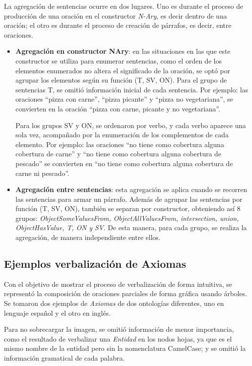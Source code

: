 La agregación de sentencias ocurre en dos lugares. Uno es durante el proceso de producción de una oración en el constructor \emph{N-Ary}, es decir dentro de una oración; el otro es durante el proceso de creación de párrafos, es decir, entre oraciones.
    
\begin{itemize}
    \item {\bf Agregación en constructor NAry}: en las situaciones en las que este constructor se utiliza para enumerar sentencias, como el orden de los elementos enumerados no altera el significado de la oración, se optó por agrupar los elementos según su función (T, SV, ON). Para el grupo de sentencias T, se omitió información inicial de cada sentencia. Por ejemplo: las oraciones ``pizza con carne'', ``pizza picante'' y ``pizza no vegetariana'', se convierten en la oración ``pizza con carne, picante y no vegetariana''.
    
    Para los grupos SV y ON, se ordenaron por verbo, y cada verbo aparece una sola vez, acompañado por la enumeración de los complementos de cada elemento. Por ejemplo: las oraciones ``no tiene como cobertura alguna cobertura de carne'' y ``no tiene como cobertura alguna cobertura de pescado'' se convierten en ``no tiene como cobertura alguna cobertura de carne ni pescado''.
    
    \item {\bf Agregación entre sentencias}: esta agregación se aplica cuando se recorren las sentencias para armar un párrafo. Además de agrupar las sentencias por función (T, SV, ON), también se separan por constructor, obteniendo así 8 grupos: \emph{ObjectSomeValuesFrom, ObjectAllValuesFrom, intersection, union, ObjectHasValue, T, ON y SV}. De esta manera, para cada grupo, se realiza la agregación, de manera independiente entre ellos.
\end{itemize}

\subsection{Ejemplos verbalización de Axiomas}
Con el objetivo de mostrar el proceso de verbalización de forma intuitiva, se representó la composición de oraciones parciales de forma gráfica usando árboles. Se tomaron dos ejemplos de \textit{Axiomas} de dos ontologías diferentes, uno en lenguaje español y el otro en inglés.

Para no sobrecargar la imagen, se omitió información de menor importancia, como el resultado de verbalizar una \textit{Entidad} en los nodos hojas, ya que es el mismo nombre de la entidad pero sin la nomenclatura CamelCase; y se omitió la información gramatical de cada palabra.

